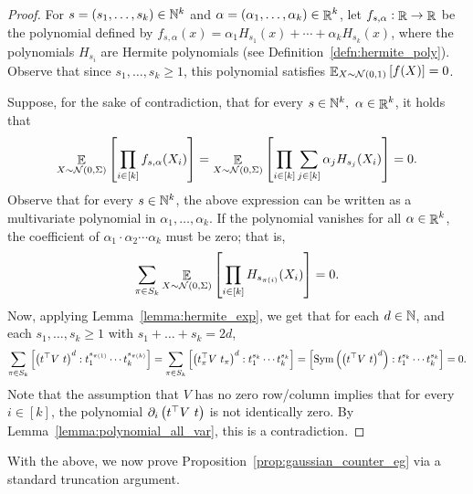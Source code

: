 \begin{proof}
	For $s = (s_1,\dots,s_k)\in \mathbb{N}^k$ and $\alpha = (\alpha_1,\dots,\alpha_k)\in \mathop{\mathbb{R}}^{k}$, let $f_{s,\alpha}:\mathop{\mathbb{R}}\to \mathop{\mathbb{R}}$ be the polynomial defined by $f_{s,\alpha}(x) = \alpha_1 H_{s_1}(x)+\cdots + \alpha_k H_{s_k}(x)$, where the polynomials $H_{s_i}$ are Hermite polynomials (see Definition~\ref{defn:hermite_poly}).	
	Observe that since $s_1,\dots,s_k \geq 1$, this polynomial satisfies $\mathop{\mathbb{E}}_{X\sim \mathcal N(0,1)} \left[ f(X) \right] = 0$.

	Suppose, for the sake of contradiction, that for every $s\in \mathbb{N}^k,\ \alpha\in \mathop{\mathbb{R}}^k$, it holds that 
	\[\mathop{\mathbb{E}}_{X\sim \mathcal N(0, \Sigma)}\left[ \prod_{i\in [k]} f_{s,\alpha}(X_i) \right] = \mathop{\mathbb{E}}_{X\sim \mathcal N(0, \Sigma)}\left[ \prod_{i\in [k]} \sum_{j\in [k]}\alpha_jH_{s_j}(X_i)  \right] =  0.\]
	Observe that for every $s\in \mathbb{N}^k$, the above expression can be written as a multivariate polynomial in $\alpha_1,\dots,\alpha_k$.
	If the polynomial vanishes for all $\alpha\in \mathop{\mathbb{R}}^k$, the coefficient of $\alpha_1\cdot \alpha_2\cdots \alpha_k$ must be zero; that is,
	\[ \sum_{\pi\in S_k}\mathop{\mathbb{E}}_{X\sim \mathcal N(0, \Sigma)}\left[ \prod_{i\in [k]} H_{s_{\pi(i)}}(X_i) \right] = 0.\]
	Now, applying Lemma~\ref{lemma:hermite_exp}, we get that for each $d\in \mathbb{N}$, and each $s_1,\dots,s_k \geq 1$ with $s_1+\dots+s_k=2d$,
	\[\sum_{\pi\in S_k}\sqbrac{\brac{t^{\top}V\ t}^d : t_1^{s_{\pi(1)}}\cdots t_k^{s_{\pi(k)}}}
		= \sum_{\pi\in S_k}\sqbrac{\brac{t_\pi^{\top}V\ t_\pi}^d : t_{1}^{s_k}\cdots t_{k}^{s_k}}
		= \sqbrac{ \Sym\brac{\brac{t^{\top}V\ t}^d} : t_{1}^{s_k}\cdots t_{k}^{s_k}} = 0. \]
	Note that the assumption that $V$ has no zero row/column implies that for every $i\in [k]$, the polynomial $\partial_i \brac{t^{\top}V\ t}$ is not identically zero.
	By Lemma~\ref{lemma:polynomial_all_var}, this is a contradiction.
\end{proof}

With the above, we now prove Proposition~\ref{prop:gaussian_counter_eg} via a standard truncation argument.

